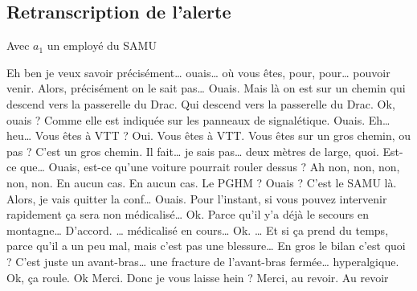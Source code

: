 \subsection{Retranscription de l'alerte}
Avec $a_1$ un employé du SAMU
\begin{dialogue}
  \Sec {} Eh ben je veux savoir précisément… ouais…
  où vous êtes, pour, pour… pouvoir venir.
  \Req Alors, précisément on le sait pas…
  \Sec Ouais.
  \Req Mais là on est sur un chemin qui descend vers la passerelle du Drac.
  \Sec Qui descend vers la passerelle du Drac. Ok, ouais ?
  \Req Comme elle est indiquée sur les panneaux de signalétique.
  \Sec Ouais. Eh… heu… Vous êtes à VTT ?
  \Req Oui.
  \Sec Vous êtes à VTT. Vous êtes sur un gros chemin, ou pas ?
  \Req C'est un gros chemin. Il fait… je sais pas… deux mètres de large, quoi.
  \Sec Est-ce que… Ouais, est-ce qu'une voiture pourrait rouler dessus ?
  \Req Ah non, non, non, non, non. En aucun cas.
  \Sec En aucun cas.
   Le PGHM ?
  \Sec Ouais ?
   C'est le SAMU là. Alors, je vais quitter la conf…
  \Sec Ouais.
   Pour l'instant, si vous pouvez intervenir rapidement ça sera non médicalisé…
  \Sec Ok.
   Parce qu’il y'a déjà le secours en montagne…
  \Sec D'accord.
   … médicalisé en cours…
  \Sec Ok.
   … Et si ça prend du temps, parce qu’il a un peu mal, mais c'est pas une blessure…
  \Sec En gros le bilan c'est quoi ?
   C'est juste un avant-bras… une fracture de l'avant-bras fermée… hyperalgique.
  \Sec Ok, ça roule. Ok
   Merci. Donc je vous laisse hein ? Merci, au revoir.
  \Sec Au revoir
  


\end{dialogue}
